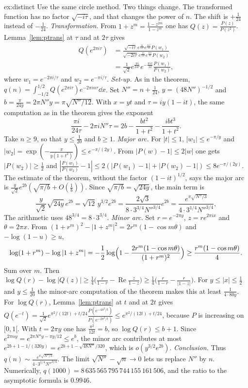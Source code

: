\begin{solution}{ex:distinct}
\idea Use the same circle method. Two things change. The transformed function has no factor $\sqrt{-i\tau}$, and that changes the power of $n$. The shift is $+\frac1{24}$ instead of $-\frac1{24}$.
\writeup \emph{Transformation.} From $1+z^m=\frac{1-z^{2m}}{1-z^m}$ one has $Q(z)=\frac{P(z)}{P(z^2)}$. Lemma~\ref{lem:ptrans} at $\tau$ and at $2\tau$ gives
\[
\begin{aligned}Q(e^{2\pi i\tau})&=\frac{\sqrt{-i\tau}\,e^{\frac{\pi i}{12\tau}}e^{\frac{\pi i\tau}{12}}P(w_1)}{\sqrt{-2i\tau}\,e^{\frac{\pi i}{24\tau}}e^{\frac{\pi i\tau}6}P(w_2)}\\&=\frac1{\sqrt2}e^{\frac{\pi i}{24\tau}}e^{-\frac{\pi i\tau}{12}}\frac{P(w_1)}{P(w_2)},\end{aligned}
\]
where $w_1=e^{-2\pi i/\tau}$ and $w_2=e^{-\pi i/\tau}$.
\emph{Set-up.} As in the theorem, $q(n)=\int_{-1/2}^{1/2}Q(e^{2\pi i\tau})e^{-2\pi in\tau}\dd x$. Set $N''=n+\frac1{24}$, $y=(48N'')^{-1/2}$ and $b=\frac\pi{24y}=2\pi N''y=\pi\sqrt{N''/12}$. With $x=yt$ and $\tau=iy(1-it)$, the same computation as in the theorem gives the exponent
\[
\frac{\pi i}{24\tau}-2\pi iN''\tau=2b-\frac{bt^2}{1+t^2}-\frac{ibt^3}{1+t^2}.
\]
Take $n\ge9$, so that $y\le\frac1{20}$ and $b\ge1$.
\emph{Major arc.} For $|t|\le1$, $|w_1|\le e^{-\pi/y}$ and $|w_2|=\exp(-\frac\pi{y(1+t^2)})\le e^{-\pi/(2y)}$. From $|P(w)-1|\le2|w|$ one gets $|P(w_2)|\ge\frac12$ and $|\frac{P(w_1)}{P(w_2)}-1|\le2(|P(w_1)-1|+|P(w_2)-1|)\le8e^{-\pi/(2y)}$. The estimate of the theorem, without the factor $(1-it)^{1/2}$, says the major arc is $\frac y{\sqrt2}e^{2b}(\sqrt{\pi/b}+O(\frac1b))$. Since $\sqrt{\pi/b}=\sqrt{24y}$, the main term is
\[
\frac y{\sqrt2}\sqrt{24y}\,e^{2b}=\sqrt{12}\,y^{3/2}e^{2b}=\frac{2\sqrt3}{8\cdot3^{3/4}N''^{3/4}}e^{2b}=\frac{e^{\pi\sqrt{N''/3}}}{4\cdot3^{1/4}N''^{3/4}},
\]
The arithmetic uses $48^{3/4}=8\cdot3^{3/4}$.
\emph{Minor arc.} Set $r=e^{-2\pi y}$, $z=re^{2\pi ix}$ and $\theta=2\pi x$. From $(1+r^m)^2-|1+z^m|^2=2r^m(1-\cos m\theta)$ and $-\log(1-u)\ge u$,
\[
\log(1+r^m)-\log|1+z^m|=-\frac12\log\Bigl(1-\frac{2r^m(1-\cos m\theta)}{(1+r^m)^2}\Bigr)\ge\frac{r^m(1-\cos m\theta)}4.
\]
Sum over $m$. Then $\log Q(r)-\log|Q(z)|\ge\frac14\bigl(\frac r{1-r}-\operatorname{Re}\frac z{1-z}\bigr)\ge\frac14\bigl(\frac r{1-r}-\frac r{|1-z|}\bigr)$. For $y\le|x|\le\frac12$ and $y\le\frac1{20}$ the minor-arc computation of the theorem makes this at least $\frac1{4\cdot80y}$. For $\log Q(r)$, Lemma~\ref{lem:ptrans} at $t$ and at $2t$ gives $Q(e^{-t})=\frac1{\sqrt2}e^{\pi^2/(12t)+t/24}\frac{P(e^{-4\pi^2/t})}{P(e^{-2\pi^2/t})}\le e^{\pi^2/(12t)+t/24}$, because $P$ is increasing on $[0,1[$. With $t=2\pi y$ one has $\frac{\pi^2}{12t}=b$, so $\log Q(r)\le b+1$. Since $e^{2\pi ny}=e^{2\pi N''y-\pi y/12}\le e^b$, the minor arc contributes at most $e^{2b+1-1/(320y)}=e^{2b+1-\sqrt{48N''}/320}$, which is $o(y^{3/2}e^{2b})$.
\emph{Conclusion.} Thus $q(n)\sim\frac{e^{\pi\sqrt{N''/3}}}{4\cdot3^{1/4}N''^{3/4}}$. The limit $\sqrt{N''}-\sqrt n\to0$ lets us replace $N''$ by $n$. Numerically, $q(1000)=8\,635\,565\,795\,744\,155\,161\,506$, and the ratio to the asymptotic formula is $0.9946$.
\end{solution}


